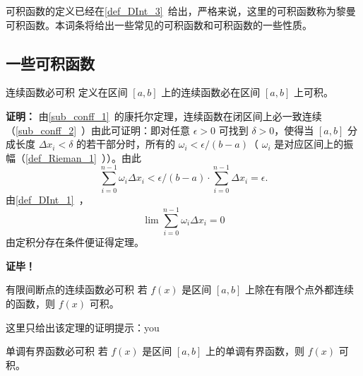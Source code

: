 可积函数的定义已经在\autoref{def_DInt_3}~给出，严格来说，这里的可积函数称为黎曼可积函数。本词条将给出一些常见的可积函数和可积函数的一些性质。
\subsection{一些可积函数}
\begin{theorem}{连续函数必可积}
定义在区间 $[a,b]$ 上的连续函数必在区间 $[a,b]$ 上可积。
\end{theorem}
\textbf{证明：}
由\autoref{sub_conff_1}~的康托尔定理，连续函数在闭区间上必一致连续（\autoref{sub_conff_2}~）由此可证明：即对任意 $\epsilon>0$ 可找到 $\delta>0$，使得当 $[a,b]$ 分成长度 $\Delta x_i<\delta$ 的若干部分时，所有的 $\omega_i<\epsilon/(b-a)$（ $\omega_i$ 是对应区间上的振幅（\autoref{def_Rieman_1}~））。由此
\begin{equation}
\sum_{i=0}^{n-1}\omega_i\Delta x_i<\epsilon/(b-a)\cdot\sum_{i=0}^{n-1}\Delta x_i=\epsilon.
\end{equation}
由\autoref{def_DInt_1}~，
\begin{equation}
\lim\sum_{i=0}^{n-1}\omega_i\Delta x_i=0
\end{equation}
由定积分存在条件便证得定理。

\textbf{证毕！}

\begin{theorem}{有限间断点的连续函数必可积}
若 $f(x)$ 是区间 $[a,b]$ 上除在有限个点外都连续的函数，则 $f(x)$ 可积。
\end{theorem}
这里只给出该定理的证明提示：you
\begin{theorem}{单调有界函数必可积}
若 $f(x)$ 是区间 $[a,b]$ 上的单调有界函数，则 $f(x)$ 可积。
\end{theorem}